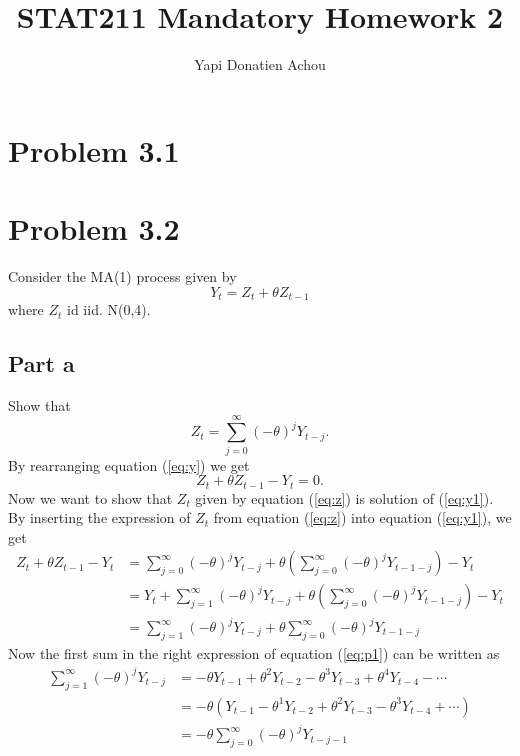 \documentclass[11pt, oneside]{article}   	%
\title{STAT211 Mandatory Homework 2}
\author{Yapi Donatien Achou}
\begin{document}
\maketitle

\section{Problem 3.1}
\section{Problem 3.2}
Consider the MA(1) process given by 
\begin{equation}\label{eq:y}
Y_{t} = Z_{t} + \theta Z_{t-1}
\end{equation}
where $Z_{t}$ id iid. N(0,4).
\subsection{Part a}
Show that 
\begin{equation}\label{eq:z}
Z_{t} = \sum_{j=0}^{\infty}(-\theta)^{j}Y_{t-j}.
\end{equation}
By rearranging equation (\ref{eq:y}) we get
\begin{equation}\label{eq:y1}
 Z_{t} + \theta Z_{t-1} -Y_{t}  = 0.
\end{equation}
Now we want to show that $Z_{t}$ given by equation (\ref{eq:z}) is solution of (\ref{eq:y1}). By inserting the expression of $Z_{t}$ from equation (\ref{eq:z}) into equation 
(\ref{eq:y1}), we get
\begin{equation}\label{eq:p1}
\begin{aligned}
Z_{t} + \theta Z_{t-1} -Y_{t} &= \sum_{j=0}^{\infty}(-\theta)^{j}Y_{t-j}+ \theta\left( \sum_{j=0}^{\infty}(-\theta)^{j}Y_{t-1-j}  \right)-Y_{t}\\
&=Y_{t} + \sum_{j=1}^{\infty}(-\theta)^{j}Y_{t-j}+ \theta\left( \sum_{j=0}^{\infty}(-\theta)^{j}Y_{t-1-j}  \right)-Y_{t}\\
&= \sum_{j=1}^{\infty}(-\theta)^{j}Y_{t-j}+ \theta \sum_{j=0}^{\infty}(-\theta)^{j}Y_{t-1-j}  
\end{aligned}
\end{equation}
Now the first sum in the right expression of equation (\ref{eq:p1}) can be written as 
\begin{equation}
\begin{aligned}
\sum_{j=1}^{\infty}(-\theta)^{j}Y_{t-j}&=-\theta Y_{t-1} + \theta^{2} Y_{t-2} -\theta^{3} Y_{t-3} + \theta^{4} Y_{t-4} - \cdots \\
&=-\theta(Y_{t-1} - \theta^{1} Y_{t-2} +\theta^{2} Y_{t-3} - \theta^{3} Y_{t-4} + \cdots)\\
&=-\theta\sum_{j=0}^{\infty}(-\theta)^{j}Y_{t-j-1}
\end{aligned}
\end{equation}
\end{document}
